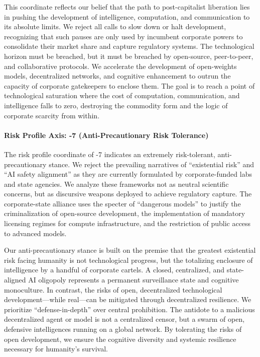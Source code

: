 This coordinate reflects our belief that the path to post-capitalist
liberation lies in pushing the development of intelligence, computation,
and communication to its absolute limits. We reject all calls to slow
down or halt development, recognizing that such pauses are only used by
incumbent corporate powers to consolidate their market share and capture
regulatory systems. The technological horizon must be breached, but it
must be breached by open-source, peer-to-peer, and collaborative
protocols. We accelerate the development of open-weights models,
decentralized networks, and cognitive enhancement to outrun the capacity
of corporate gatekeepers to enclose them. The goal is to reach a point
of technological saturation where the cost of computation,
communication, and intelligence falls to zero, destroying the commodity
form and the logic of corporate scarcity from within.

\paragraph{Risk Profile Axis: -7 (Anti-Precautionary Risk
Tolerance)}\label{risk-profile-axis--7-anti-precautionary-risk-tolerance}

The risk profile coordinate of -7 indicates an extremely risk-tolerant,
anti-precautionary stance. We reject the prevailing narratives of
``existential risk'' and ``AI safety alignment'' as they are currently
formulated by corporate-funded labs and state agencies. We analyze these
frameworks not as neutral scientific concerns, but as discursive weapons
deployed to achieve regulatory capture. The corporate-state alliance
uses the specter of ``dangerous models'' to justify the criminalization
of open-source development, the implementation of mandatory licensing
regimes for compute infrastructure, and the restriction of public access
to advanced models.

Our anti-precautionary stance is built on the premise that the greatest
existential risk facing humanity is not technological progress, but the
totalizing enclosure of intelligence by a handful of corporate cartels.
A closed, centralized, and state-aligned AI oligopoly represents a
permanent surveillance state and cognitive monoculture. In contrast, the
risks of open, decentralized technological development---while
real---can be mitigated through decentralized resilience. We prioritize
``defense-in-depth'' over central prohibition. The antidote to a
malicious decentralized agent or model is not a centralized censor, but
a swarm of open, defensive intelligences running on a global network. By
tolerating the risks of open development, we ensure the cognitive
diversity and systemic resilience necessary for humanity's survival.

